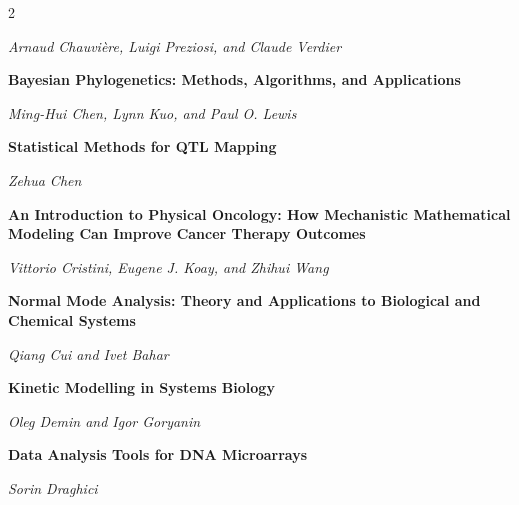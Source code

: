 \begin{multicols}{2}
\begin{minipage}{\linewidth}
\textit{Arnaud Chauvière, Luigi Preziosi, and Claude Verdier}
\end{minipage}\par\medskip
\par\noindent\begin{minipage}{\linewidth}
\raggedright
\textbf{Bayesian Phylogenetics: Methods, Algorithms, and Applications}\par
\textit{Ming-Hui Chen, Lynn Kuo, and Paul O. Lewis}
\end{minipage}\par\medskip
\par\noindent\begin{minipage}{\linewidth}
\raggedright
\textbf{Statistical Methods for QTL Mapping}\par
\textit{Zehua Chen}
\end{minipage}\par\medskip
\par\noindent\begin{minipage}{\linewidth}
\raggedright
\textbf{An Introduction to Physical Oncology: How Mechanistic Mathematical Modeling Can Improve Cancer Therapy Outcomes}\par
\textit{Vittorio Cristini, Eugene J. Koay, and Zhihui Wang}
\end{minipage}\par\medskip
\par\noindent\begin{minipage}{\linewidth}
\raggedright
\textbf{Normal Mode Analysis: Theory and Applications to Biological and Chemical Systems}\par
\textit{Qiang Cui and Ivet Bahar}
\end{minipage}\par\medskip
\par\noindent\begin{minipage}{\linewidth}
\raggedright
\textbf{Kinetic Modelling in Systems Biology}\par
\textit{Oleg Demin and Igor Goryanin}
\end{minipage}\par\medskip
\par\noindent\begin{minipage}{\linewidth}
\raggedright
\textbf{Data Analysis Tools for DNA Microarrays}\par
\textit{Sorin Draghici}
\end{minipage}\par\medskip
\par\noindent\begin{minipage}{\linewidth}

\end{minipage}
\end{multicols}
